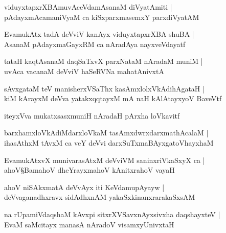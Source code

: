 \begin{shloka}
viduyxtapxrXBAmuvAceVdamAsanaM diVyatAmiti |\\
pAdayxmAcamaniVyaM ca kiSxparxmasemxY parxdiVyatAM 
\end{shloka}

\begin{shloka}
EvamukAtx tadA deVviV kanAyx viduyxtapxrXBA shuBA |\\
AsanaM pAdayxmaGayxRM ca nAradAya nayxveVdayatf
\end{shloka}

\begin{shloka}
tataH kaqtAsanaM daqSaTxvX parxNataM nAradaM muniM |\\
uvAca vacanaM deVviV haSeRVNa mahatAnivxtA 
\end{shloka}

\begin{shloka}
sAvxgataM teV manisherxVSaThx kasAmxlolxVkAdihAgataH |\\
kiM kArayxM deVva yatakxqqtayxM mA naH kAlAtayxyoV BaveVtf 
\end{shloka}

\begin{shloka}
iteyxVva mukatxsasxmuniH nAradaH pArxha loVkavitf 
\end{shloka}

\begin{shloka}
barxhamxloVkAdiMdarxloVkaM tasAmxdwrxdarxmathAcalaM |\\
ihasAthxM tAvxM ca veY deVvi darxSuTxmaBAyxgatoVhayxhaM 
\end{shloka}

\begin{shloka}
EvamukAtxvX munivarasAtxM deVviVM saninxriVkaSxyX ca |\\
ahoV\S BamahoV dheYrayxmahoV kAnitxrahoV vayaH 
\end{shloka}

\begin{shloka}
ahoV niSAkxmatA deVvAyx iti KeVdamupAyayw |\\
deVvaganadhxravx sidAdhxnAM yakaSxkinanxrarakaSxsAM
\end{shloka}

\begin{shloka}
na rUpamiVdaqshaM kAvxpi sitxrXVSavxnAyxsivxha daqshayxteV |\\
EvaM saMcitayx manasA nAradoV visamxyUnivxtaH 
\end{shloka}

